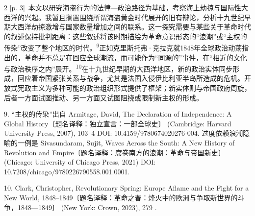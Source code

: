 \documentclass[10pt,a4paper]{article}
\begin{document}
\begin{paracol}{2}
{\scriptsize\color{gray} [p. 3]}\ 本文以研究海盗行为的法律—政治路径为基础，考察海上劫掠与国际性大西洋的兴起。我暂且搁置围绕所谓海盗黄金时代展开的旧有辩论，分析十九世纪早期大西洋劫掠激增与国家数量增加之间的联系。这一探究需要与某些关于革命时代的叙述保持批判距离：这些叙述将该时期描绘为革命意识形态的“浪潮”或“主权的传染”改变了整个地区的时\mbox{代。\textsuperscript{9}}正如克里斯托弗·克拉克就1848年全球政治动荡指出的，革命并不总是在回应全球潮流，而可能作为“同源的”事件，在“相近的文化与政治秩序之内”展\mbox{开。\textsuperscript{10}}在十九世纪早期的大西洋地区，新的政治实体同步形成，回应着帝国紧张关系与战争，尤其是法国入侵伊比利亚半岛所造成的危机。开放式宪政主义为多种可能的政治组织形式提供了框架；新实体则与帝国政府周旋，后者一方面试图推动、另一方面又试图阻挠或限制新主权的形成。\par{\small 9. “主权的传染”出自 Armitage, David, The Declaration of Independence: A Global History〔题名译释：独立宣言：一部全球史〕 (Cambridge: Harvard University Press, 2007), 103–4 DOI: 10.4159/9780674020276-004. 过度依赖浪潮隐喻的一例是 Sivasundaram, Sujit, Waves Across the South: A New History of Revolution and Empire〔题名译释：席卷南方的浪潮：革命与帝国新史〕 (Chicago: University of Chicago Press, 2021) DOI: 10.7208/chicago/9780226790558.001.0001.\par}{\small 10. Clark, Christopher, Revolutionary Spring: Europe Aflame and the Fight for a New World, 1848–1849〔题名译释：革命之春：烽火中的欧洲与争取新世界的斗争，1848—1849〕 (New York: Crown, 2023), 279 .\par}
\switchcolumn

\end{paracol}
\end{document}

